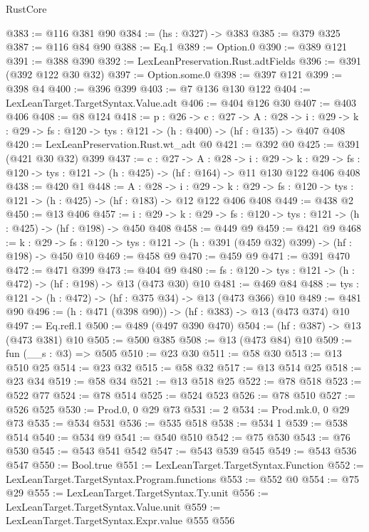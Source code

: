 \begin{lexlean}{RustCore}
\begin{coremodule}
@383 := @116 @381 @90
@384 := (hs : @327) -> @383
@385 := @379 @325
@387 := @116 @84 @90
@388 := Eq.{1}
@389 := Option.{0}
@390 := @389 @121
@391 := @388 @390
@392 := LexLeanPreservation.Rust.adtFields
@396 := @391 (@392 @122 @30 @32)
@397 := Option.some.{0}
@398 := @397 @121
@399 := @398 @4
@400 := @396 @399
@403 := @7 @136 @130 @122
@404 := LexLeanTarget.TargetSyntax.Value.adt
@406 := @404 @126 @30
@407 := @403 @406
@408 := @8 @124
@418 := {p : @26} ->
  {c : @27} ->
  {A : @28} ->
  {i : @29} -> {k : @29} -> {fs : @120} -> {tys : @121} -> (h : @400) -> (hf : @135) -> @407 @408
@420 := LexLeanPreservation.Rust.wt_adt @0
@421 := @392 @0
@425 := @391 (@421 @30 @32) @399
@437 := {c : @27} ->
  {A : @28} ->
  {i : @29} ->
  {k : @29} -> {fs : @120} -> {tys : @121} -> (h : @425) -> (hf : @164) -> @11 @130 @122 @406 @408
@438 := @420 @1
@448 := {A : @28} ->
  {i : @29} ->
  {k : @29} -> {fs : @120} -> {tys : @121} -> (h : @425) -> (hf : @183) -> @12 @122 @406 @408
@449 := @438 @2
@450 := @13 @406
@457 := {i : @29} ->
  {k : @29} -> {fs : @120} -> {tys : @121} -> (h : @425) -> (hf : @198) -> @450 @408
@458 := @449 @9
@459 := @421 @9
@468 := {k : @29} ->
  {fs : @120} -> {tys : @121} -> (h : @391 (@459 @32) @399) -> (hf : @198) -> @450 @10
@469 := @458 @9
@470 := @459 @9
@471 := @391 @470
@472 := @471 @399
@473 := @404 @9
@480 := {fs : @120} -> {tys : @121} -> (h : @472) -> (hf : @198) -> @13 (@473 @30) @10
@481 := @469 @84
@488 := {tys : @121} -> (h : @472) -> (hf : @375 @34) -> @13 (@473 @366) @10
@489 := @481 @90
@496 := (h : @471 (@398 @90)) -> (hf : @383) -> @13 (@473 @374) @10
@497 := Eq.refl.{1}
@500 := @489 (@497 @390 @470)
@504 := (hf : @387) -> @13 (@473 @381) @10
@505 := @500 @385
@508 := @13 (@473 @84) @10
@509 := fun (__s : @3) => @505
@510 := @23 @30
@511 := @58 @30
@513 := @13 @510 @25
@514 := @23 @32
@515 := @58 @32
@517 := @13 @514 @25
@518 := @23 @34
@519 := @58 @34
@521 := @13 @518 @25
@522 := @78 @518
@523 := @522 @77
@524 := @78 @514
@525 := @524 @523
@526 := @78 @510
@527 := @526 @525
@530 := Prod.{0, 0} @29 @73
@531 := 2
@534 := Prod.mk.{0, 0} @29 @73
@535 := @534 @531
@536 := @535 @518
@538 := @534 1
@539 := @538 @514
@540 := @534 @9
@541 := @540 @510
@542 := @75 @530
@543 := @76 @530
@545 := @543 @541 @542
@547 := @543 @539 @545
@549 := @543 @536 @547
@550 := Bool.true
@551 := LexLeanTarget.TargetSyntax.Function
@552 := LexLeanTarget.TargetSyntax.Program.functions
@553 := @552 @0
@554 := @75 @29
@555 := LexLeanTarget.TargetSyntax.Ty.unit
@556 := LexLeanTarget.TargetSyntax.Value.unit
@559 := LexLeanTarget.TargetSyntax.Expr.value @555 @556

\end{coremodule}
\end{lexlean}
